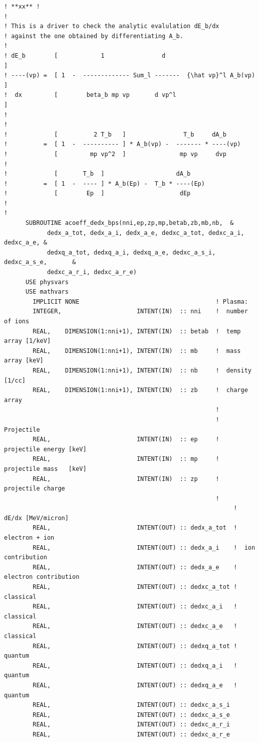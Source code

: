 \documentclass[preprint,12pt,eqsecnum,nofootinbib,amsmath,amssymb]{revtex4}
\begin{document}
{\begin{verbatim}
! **xx** !
!
! This is a driver to check the analytic evalulation dE_b/dx
! against the one obtained by differentiating A_b.
!
! dE_b        [            1                d                           ]
! ----(vp) =  [ 1  -  ------------- Sum_l -------  {\hat vp}^l A_b(vp)  ]
!  dx         [        beta_b mp vp       d vp^l                        ]
!
!
!             [          2 T_b   ]                T_b     dA_b
!          =  [ 1  -  ---------- ] * A_b(vp) -  ------- * ----(vp)
!             [         mp vp^2  ]               mp vp     dvp
!
!             [       T_b  ]                    dA_b
!          =  [ 1  -  ---- ] * A_b(Ep) -  T_b * ----(Ep)
!             [        Ep  ]                     dEp
!
!
      SUBROUTINE acoeff_dedx_bps(nni,ep,zp,mp,betab,zb,mb,nb,  &
            dedx_a_tot, dedx_a_i, dedx_a_e, dedxc_a_tot, dedxc_a_i, dedxc_a_e, & 
            dedxq_a_tot, dedxq_a_i, dedxq_a_e, dedxc_a_s_i, dedxc_a_s_e,       &
            dedxc_a_r_i, dedxc_a_r_e)
      USE physvars
      USE mathvars      
        IMPLICIT NONE                                      ! Plasma:
        INTEGER,                     INTENT(IN)  :: nni    !  number of ions
        REAL,    DIMENSION(1:nni+1), INTENT(IN)  :: betab  !  temp array [1/keV]
        REAL,    DIMENSION(1:nni+1), INTENT(IN)  :: mb     !  mass array [keV]
        REAL,    DIMENSION(1:nni+1), INTENT(IN)  :: nb     !  density [1/cc]
        REAL,    DIMENSION(1:nni+1), INTENT(IN)  :: zb     !  charge array
                                                           !
                                                           ! Projectile  
        REAL,                        INTENT(IN)  :: ep     !  projectile energy [keV]
        REAL,                        INTENT(IN)  :: mp     !  projectile mass   [keV]
        REAL,                        INTENT(IN)  :: zp     !  projectile charge
                                                           !
                                                                ! dE/dx [MeV/micron]
        REAL,                        INTENT(OUT) :: dedx_a_tot  !  electron + ion
        REAL,                        INTENT(OUT) :: dedx_a_i    !  ion contribution
        REAL,                        INTENT(OUT) :: dedx_a_e    !  electron contribution
        REAL,                        INTENT(OUT) :: dedxc_a_tot !  classical
        REAL,                        INTENT(OUT) :: dedxc_a_i   !  classical
        REAL,                        INTENT(OUT) :: dedxc_a_e   !  classical
        REAL,                        INTENT(OUT) :: dedxq_a_tot !  quantum
        REAL,                        INTENT(OUT) :: dedxq_a_i   !  quantum
        REAL,                        INTENT(OUT) :: dedxq_a_e   !  quantum
        REAL,                        INTENT(OUT) :: dedxc_a_s_i
        REAL,                        INTENT(OUT) :: dedxc_a_s_e
        REAL,                        INTENT(OUT) :: dedxc_a_r_i
        REAL,                        INTENT(OUT) :: dedxc_a_r_e


\end{verbatim}}
\end{document}
